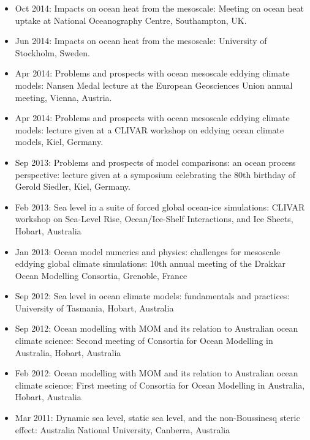 \documentclass{article}
\begin{document}
\begin{itemize}[leftmargin=*]
\item Oct 2014: {\sc Impacts on ocean heat from the mesoscale}:
  Meeting on ocean heat uptake at National Oceanography Centre,
  Southampton, UK.

\item Jun 2014: {\sc Impacts on ocean heat from the mesoscale}:
  University of Stockholm, Sweden.

\item Apr 2014: {\sc Problems and prospects with ocean mesoscale
    eddying climate models}: Nansen Medal lecture at the European
  Geosciences Union annual meeting, Vienna, Austria.

\item Apr 2014: {\sc Problems and prospects with ocean mesoscale
    eddying climate models}: lecture given at a CLIVAR workshop on
  eddying ocean climate models, Kiel, Germany.

\item Sep 2013: {\sc Problems and prospects of model comparisons: an
    ocean process perspective}: lecture given at a symposium
  celebrating the 80th birthday of Gerold Siedler, Kiel, Germany.

\item Feb 2013: {\sc Sea level in a suite of forced global ocean-ice
    simulations}: CLIVAR workshop on Sea-Level Rise, Ocean/Ice-Shelf
  Interactions, and Ice Sheets, Hobart, Australia

\item Jan 2013: {\sc Ocean model numerics and physics: challenges for
    mesoscale eddying global climate simulations}: 10th annual meeting
  of the Drakkar Ocean Modelling Consortia, Grenoble, France

\item Sep 2012: {\sc Sea level in ocean climate models: fundamentals
    and practices}: University of Tasmania, Hobart, Australia

\item Sep 2012: {\sc Ocean modelling with MOM and its relation to
    Australian ocean climate science}: Second meeting of Consortia for
  Ocean Modelling in Australia, Hobart, Australia

\item Feb 2012: {\sc Ocean modelling with MOM and its relation to
    Australian ocean climate science}: First meeting of Consortia for
  Ocean Modelling in Australia, Hobart, Australia

\item Mar 2011: {\sc Dynamic sea level, static sea level, and the
    non-Boussinesq steric effect}: Australia National University,
  Canberra, Australia


\end{itemize}
\end{document}
